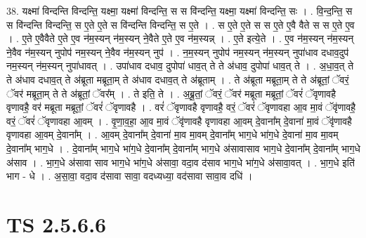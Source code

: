 \documentclass[17pt]{extarticle}
\begin{document}
38. यक्ष्मा॑ विन्दन्ति विन्दन्ति॒ यक्ष्मा॒ यक्ष्मा॑ विन्दन्ति॒ स स वि॑न्दन्ति॒ यक्ष्मा॒ यक्ष्मा॑ विन्दन्ति॒ सः । . वि॒न्द॒न्ति॒ स स वि॑न्दन्ति विन्दन्ति॒ स ए॒ते ए॒ते स वि॑न्दन्ति विन्दन्ति॒ स ए॒ते । . स ए॒ते ए॒ते स स ए॒ते ए॒वै वैते स स ए॒ते ए॒व । . ए॒ते ए॒वैवैते ए॒ते ए॒व न॑म॒स्यन् न॑म॒स्यन् ने॒वैते ए॒ते ए॒व न॑म॒स्यन्न् । . ए॒ते इत्ये॒ते । . ए॒व न॑म॒स्यन् न॑म॒स्यन् ने॒वैव न॑म॒स्यन् नुपोप॑ नम॒स्यन् ने॒वैव न॑म॒स्यन् नुप॑ । . न॒म॒स्यन् नुपोप॑ नम॒स्यन् न॑म॒स्यन् नुपा॑धाव दधाव॒दुप॑ नम॒स्यन् न॑म॒स्यन् नुपा॑धावत् । . उपा॑धाव दधाव॒ दुपोपा॑ धाव॒त् ते ते अ॑धाव॒ दुपोपा॑ धाव॒त् ते । . अ॒धा॒व॒त् ते ते अ॑धाव दधाव॒त् ते अ॑ब्रूता मब्रूता॒म् ते अ॑धाव दधाव॒त् ते अ॑ब्रूताम् । . ते अ॑ब्रूता मब्रूता॒म् ते ते अ॑ब्रूतां॒ ॅवरं॒ ॅवर॑ मब्रूता॒म् ते ते अ॑ब्रूतां॒ ॅवर᳚म् । . ते इति॒ ते । . अ॒ब्रू॒तां॒ ॅवरं॒ ॅवर॑ मब्रूता मब्रूतां॒ ॅवरं॑ ॅवृणावहै वृणावहै॒ वर॑ मब्रूता मब्रूतां॒ ॅवरं॑ ॅवृणावहै । . वरं॑ ॅवृणावहै वृणावहै॒ वरं॒ ॅवरं॑ ॅवृणावहा आ॒व मा॒वं ॅवृ॑णावहै॒ वरं॒ ॅवरं॑ ॅवृणावहा आ॒वम् । . वृ॒णा॒व॒हा॒ आ॒व मा॒वं ॅवृ॑णावहै वृणावहा आ॒वम् दे॒वाना᳚म् दे॒वाना॑ मा॒वं ॅवृ॑णावहै वृणावहा आ॒वम् दे॒वाना᳚म् । . आ॒वम् दे॒वाना᳚म् दे॒वाना॑ मा॒व मा॒वम् दे॒वाना᳚म् भाग॒धे भा॑ग॒धे दे॒वाना॑ मा॒व मा॒वम् दे॒वाना᳚म् भाग॒धे । . दे॒वाना᳚म् भाग॒धे भा॑ग॒धे दे॒वाना᳚म् दे॒वाना᳚म् भाग॒धे अ॑सावासाव भाग॒धे दे॒वाना᳚म् दे॒वाना᳚म् भाग॒धे अ॑साव । . भा॒ग॒धे अ॑सावा साव भाग॒धे भा॑ग॒धे अ॑सावा॒ वदा॒व द॑साव भाग॒धे भा॑ग॒धे अ॑सावा॒वत् । . भा॒ग॒धे इति॑ भाग - धे । . अ॒सा॒वा॒ वदा॒व द॑सावा सावा॒ वदध्यध्या॒ वद॑सावा सावा॒व दधि॑ । \newline
\pagebreak
{}

\section{ TS 2.5.6.6 }
\end{document}
